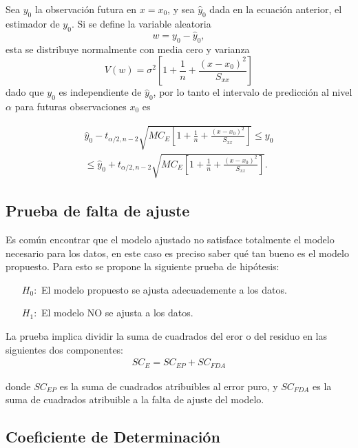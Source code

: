 Sea $y_{0}$ la observaci\'on futura en $x=x_{0}$, y sea $\hat{y}_{0}$ dada en la ecuaci\'on anterior, el estimador de $y_{0}$. Si se define la variable aleatoria $$w=y_{0}-\hat{y}_{0},$$ esta se distribuye normalmente con media cero y varianza $$V\left(w\right)=\sigma^{2}\left[1+\frac{1}{n}+\frac{\left(x-x_{0}\right)^2}{S_{xx}}\right]$$
dado que $y_{0}$ es independiente de $\hat{y}_{0}$, por lo tanto el intervalo de predicci\'on al nivel $\alpha$ para futuras observaciones $x_{0}$ es


\begin{eqnarray*}
\hat{y}_{0}-t_{\alpha/2,n-2}\sqrt{MC_{E}\left[1+\frac{1}{n}+\frac{\left(x-x_{0}\right)^2}{S_{xx}}\right]}\leq y_{0}\\
\leq \hat{y}_{0}+t_{\alpha/2,n-2}\sqrt{MC_{E}\left[1+\frac{1}{n}+\frac{\left(x-x_{0}\right)^2}{S_{xx}}\right]}.
\end{eqnarray*}





\subsection{Prueba de falta de ajuste}
Es com\'un encontrar que el modelo ajustado no satisface totalmente el modelo necesario para los datos, en este caso es preciso saber qu\'e tan bueno es el modelo propuesto. Para esto se propone la siguiente prueba de hip\'otesis:
\begin{itemize}
\item[$H_{0}:$ ]El modelo propuesto se ajusta adecuademente a los datos.
\item[$H_{1}:$ ]El modelo NO se ajusta a los datos.
\end{itemize}
La prueba implica dividir la suma de cuadrados del eror o del residuo en las siguientes dos componentes:
\begin{eqnarray*}
SC_{E}=SC_{EP}+SC_{FDA}
\end{eqnarray*}



donde $SC_{EP}$ es la suma de cuadrados atribuibles al error puro, y $SC_{FDA}$ es la suma de cuadrados atribuible a la falta de ajuste del modelo.


%


\subsection{Coeficiente de Determinaci\'on}



